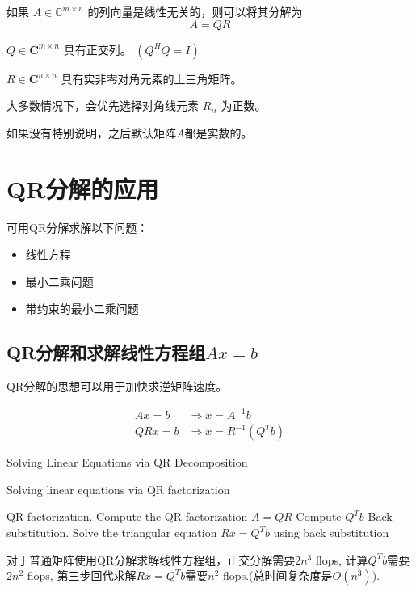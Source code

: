 \begin{theorem}
    如果 $A \in \mathbb{C}^{m \times n}$ 的列向量是线性无关的，则可以将其分解为
$$
A=Q R
$$

$Q \in \boldsymbol{C}^{m \times n}$ 具有正交列。 $\left(Q^{H} Q=I\right)$

$R \in \boldsymbol{C}^{n \times n}$ 具有实非零对角元素的上三角矩阵。
\end{theorem}

大多数情况下，会优先选择对角线元素 $R_{i i}$ 为正数。

如果没有特别说明，之后默认矩阵$A$都是实数的。

\section{QR分解的应用}

可用QR分解求解以下问题：

\begin{itemize}
    \item 线性方程
    \item 最小二乘问题
    \item 带约束的最小二乘问题
\end{itemize}

\subsection{QR分解和求解线性方程组$Ax = b$}

QR分解的思想可以用于加快求逆矩阵速度。

\begin{corollary}
$$\begin{aligned}
   Ax = b &\Rightarrow x = A^{-1} b \\
QRx = b &\Rightarrow x = R^{-1} \left(Q^Tb\right)
\end{aligned}
$$
\end{corollary}

\begin{algorithm}[htbp]
    \caption[]{Solving Linear Equations via QR Decomposition}
    \caption{Solving linear equations via QR factorization}
    QR factorization. Compute the QR factorization $ A=Q R $\;
    Compute $ Q^{T} b $\;
    Back substitution. Solve the triangular equation $ R x=Q^{T} b $ using back substitution\;
\end{algorithm}

对于普通矩阵使用QR分解求解线性方程组，正交分解需要$2 n^3$ flops, 计算$Q^T b$需要$2n^2$ flops, 第三步回代求解$Rx = Q^Tb$需要$n^2$ flops.(总时间复杂度是$O(n^3)$). 


